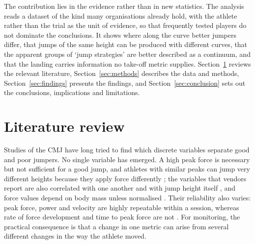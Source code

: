 The contribution lies in the evidence rather than in new statistics. The analysis reads a dataset of the kind many organisations already hold, with the athlete rather than the trial as the unit of evidence, so that frequently tested players do not dominate the conclusions. It shows where along the curve better jumpers differ, that jumps of the same height can be produced with different curves, that the apparent groups of `jump strategies' are better described as a continuum, and that the landing carries information no take-off metric supplies. Section~\ref{sec:lit} reviews the relevant literature, Section~\ref{sec:methods} describes the data and methods, Section~\ref{sec:findings} presents the findings, and Section~\ref{sec:conclusion} sets out the conclusions, implications and limitations.

\section{Literature review}
\label{sec:lit}

Studies of the CMJ have long tried to find which discrete variables separate good and poor jumpers. No single variable has emerged. A high peak force is necessary but not sufficient for a good jump, and athletes with similar peaks can jump very different heights because they apply force differently \parencite{dowling1993}; the variables that vendors report are also correlated with one another and with jump height itself \parencite{laffaye2014}, and force values depend on body mass unless normalised \parencite{mcmahon2018}. Their reliability also varies: peak force, power and velocity are highly repeatable within a session, whereas rate of force development and time to peak force are not \parencite{hori2009}. For monitoring, the practical consequence is that a change in one metric can arise from several different changes in the way the athlete moved.

